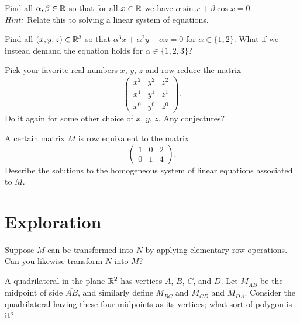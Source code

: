 \documentclass{homework}
\begin{document}
\begin{problem}\label{sin-cos-linear-system}Find all $\alpha, \beta \in \mathbb{R}$ so that for all $x \in \mathbb{R}$ we have $\alpha \sin x + \beta \cos x = 0$.  \textit{Hint:}~Relate this to solving a linear system of equations.
\end{problem}

\begin{problem}
  Find all $(x,y,z) \in \mathbb{R}^3$ so that $\alpha^3 x + \alpha^2 y + \alpha z = 0$ for $\alpha \in \{1,2\}$.  What if we instead demand the equation holds for $\alpha \in \{1,2,3\}$?
\end{problem}

\begin{problem}
  Pick your favorite real numbers $x$, $y$, $z$ and row reduce the matrix
  \[
    \begin{pmatrix}
      x^2 & y^2 & z^2 \\
      x^1 & y^1 & z^1 \\
      x^0 & y^0 & z^0            
    \end{pmatrix}.
  \]
  Do it again for some other choice of $x$, $y$, $z$.  Any conjectures?
\end{problem}

\begin{problem}
  A certain matrix $M$ is row equivalent to the matrix
  \[
    \begin{pmatrix}
      1 & 0 & 2 \\
      0 & 1 & 4
    \end{pmatrix}.
  \]
  Describe the solutions to the homogeneous system of linear equations
  associated to $M$.
\end{problem}

\section{Exploration}

\begin{problem}
  Suppose $M$ can be transformed into $N$ by applying elementary row
  operations.  Can you likewise transform $N$ into $M$?
\end{problem}

\begin{problem}\label{exploration:quadrilateral-midpoints}
  A quadrilateral in the plane $\mathbb{R}^2$ has vertices $A$, $B$, $C$, and
  $D$.  Let $M_{\overline{AB}}$ be the midpoint of side
  $\overline{AB}$, and similarly define $M_{\overline{BC}}$ and
  $M_{\overline{CD}}$ and $M_{\overline{DA}}$.  Consider the
  quadrilateral having these four midpoints as its vertices; what sort
  of polygon is it?
\end{problem}
\end{document}
